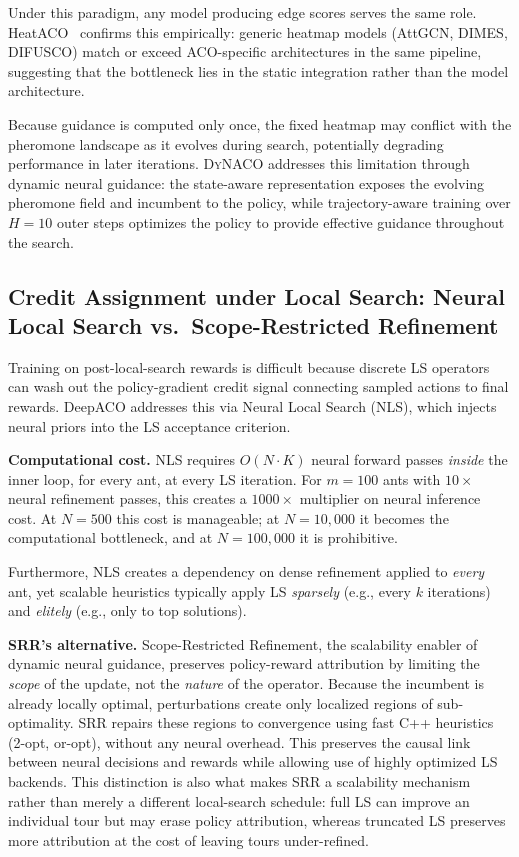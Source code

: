 \documentclass[sigconf]{acmart}
\newcommand{\DyNACO}{\textsc{DyNACO}}
\begin{document}
Under this paradigm, any model producing edge scores serves the same role.
HeatACO~\cite{heataco} confirms this empirically: generic heatmap models (AttGCN, DIMES, DIFUSCO) match or exceed ACO-specific architectures in the same pipeline, suggesting that the bottleneck lies in the static integration rather than the model architecture.

Because guidance is computed only once, the fixed heatmap may conflict with the pheromone landscape as it evolves during search, potentially degrading performance in later iterations.
\DyNACO{} addresses this limitation through dynamic neural guidance: the state-aware representation exposes the evolving pheromone field and incumbent to the policy, while trajectory-aware training over $H{=}10$ outer steps optimizes the policy to provide effective guidance throughout the search.

\subsection{Credit Assignment under Local Search: Neural Local Search vs.\ Scope-Restricted Refinement}
\label{app:nls-analysis}

Training on post-local-search rewards is difficult because discrete LS operators can wash out the policy-gradient credit signal connecting sampled actions to final rewards.
DeepACO addresses this via Neural Local Search (NLS), which injects neural priors into the LS acceptance criterion.

\textbf{Computational cost.}
NLS requires $O(N \cdot K)$ neural forward passes \emph{inside} the inner loop, for every ant, at every LS iteration.
For $m{=}100$ ants with $10{\times}$ neural refinement passes, this creates a $1000{\times}$ multiplier on neural inference cost.
At $N{=}500$ this cost is manageable; at $N{=}10{,}000$ it becomes the computational bottleneck, and at $N{=}100{,}000$ it is prohibitive.

Furthermore, NLS creates a dependency on dense refinement applied to \emph{every} ant, yet scalable heuristics typically apply LS \emph{sparsely} (e.g., every $k$ iterations) and \emph{elitely} (e.g., only to top solutions).

\textbf{SRR's alternative.}
Scope-Restricted Refinement, the scalability enabler of dynamic neural guidance, preserves policy-reward attribution by limiting the \emph{scope} of the update, not the \emph{nature} of the operator.
Because the incumbent is already locally optimal, perturbations create only localized regions of sub-optimality.
SRR repairs these regions to convergence using fast C++ heuristics (2-opt, or-opt), without any neural overhead.
This preserves the causal link between neural decisions and rewards while allowing use of highly optimized LS backends.
This distinction is also what makes SRR a scalability mechanism rather than merely a different local-search schedule: full LS can improve an individual tour but may erase policy attribution, whereas truncated LS preserves more attribution at the cost of leaving tours under-refined.
\end{document}
